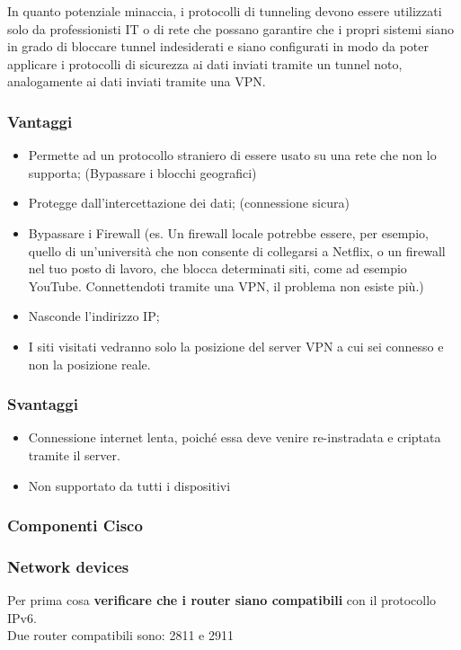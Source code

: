 In quanto potenziale minaccia, i protocolli di tunneling devono essere utilizzati solo da professionisti IT o di rete che possano garantire che i propri sistemi siano in grado di bloccare tunnel indesiderati e siano configurati in modo da poter applicare i protocolli di sicurezza ai dati inviati tramite un tunnel noto, analogamente ai dati inviati tramite una VPN.

\subsubsection{Vantaggi}
\begin{itemize}
    \item Permette ad un protocollo straniero di essere usato su una rete che non lo supporta; (Bypassare i blocchi geografici)
    \item Protegge dall'intercettazione dei dati; (connessione sicura)
    \item Bypassare i Firewall (es. Un firewall locale potrebbe essere, per esempio, quello di un’università che non consente di collegarsi a Netflix, o un firewall nel tuo posto di lavoro, che blocca determinati siti, come ad esempio YouTube. Connettendoti tramite una VPN, il problema non esiste più.)
    \item Nasconde l’indirizzo IP;
    \item I siti visitati vedranno solo la posizione del server VPN a cui sei connesso e non la posizione reale.
\end{itemize}

\subsubsection{Svantaggi}
\begin{itemize}
    \item Connessione internet lenta, poiché essa deve venire re-instradata e criptata tramite il server.
    \item Non supportato da tutti i dispositivi
\end{itemize}

\subsubsection{Componenti Cisco}

\subsubsection*{Network devices}
Per prima cosa \textbf{verificare che i router siano compatibili} con il protocollo IPv6.\\
Due router compatibili sono: 2811 e 2911

